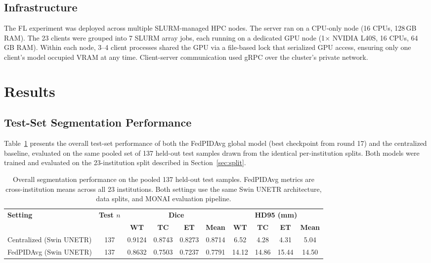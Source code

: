 \documentclass{article}
\begin{document}
\subsection{Infrastructure}

The FL experiment was deployed across multiple SLURM-managed HPC nodes. The server ran on a CPU-only node (16 CPUs, 128\,GB RAM). The 23 clients were grouped into 7 SLURM array jobs, each running on a dedicated GPU node (1$\times$ NVIDIA L40S, 16 CPUs, 64\,GB RAM). Within each node, 3--4 client processes shared the GPU via a file-based lock that serialized GPU access, ensuring only one client's model occupied VRAM at any time. Client-server communication used gRPC over the cluster's private network.

\section{Results}
\label{sec:results}

\subsection{Test-Set Segmentation Performance}

Table~\ref{tab:main_results} presents the overall test-set performance of both the FedPIDAvg global model (best checkpoint from round 17) and the centralized baseline, evaluated on the same pooled set of 137 held-out test samples drawn from the identical per-institution splits. Both models were trained and evaluated on the 23-institution split described in Section~\ref{sec:split}.

\begin{table}[h]
\centering
\small
\begin{tabular}{lc cccc cccc}
\toprule
\textbf{Setting} & \textbf{Test $n$}
  & \multicolumn{4}{c}{\textbf{Dice}}
  & \multicolumn{4}{c}{\textbf{HD95 (mm)}} \\
\cmidrule(lr){3-6} \cmidrule(lr){7-10}
 &  & \textbf{WT} & \textbf{TC} & \textbf{ET} & \textbf{Mean}
    & \textbf{WT} & \textbf{TC} & \textbf{ET} & \textbf{Mean} \\
\midrule
Centralized (Swin UNETR) & 137 & 0.9124 & 0.8743 & 0.8273 & 0.8714 &  6.52 &  4.28 &  4.31 &  5.04 \\
FedPIDAvg   (Swin UNETR) & 137 & 0.8632 & 0.7503 & 0.7237 & 0.7791 & 14.12 & 14.86 & 15.44 & 14.50 \\
\bottomrule
\end{tabular}
\caption{Overall segmentation performance on the pooled 137 held-out test samples. FedPIDAvg metrics are cross-institution means across all 23 institutions. Both settings use the same Swin UNETR architecture, data splits, and MONAI evaluation pipeline.}
\label{tab:main_results}
\end{table}
\end{document}
